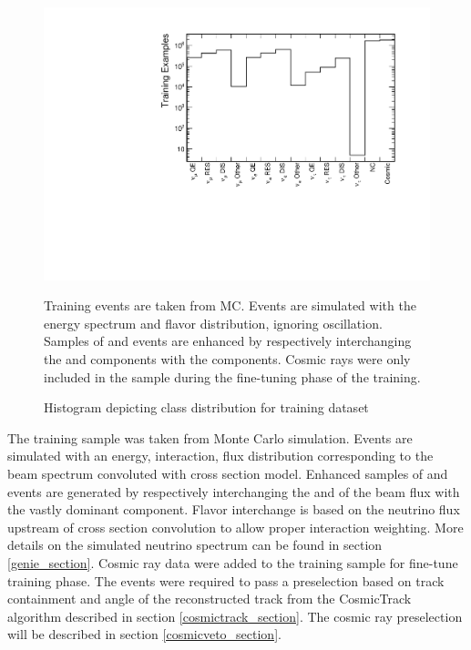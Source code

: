 \begin{figure}[t]
\begin{center}
\includegraphics[width=\textwidth]{figures/cnn/traindist.pdf}
\end{center}
\caption{Histogram depicting class distribution for training dataset}{
  Training events are taken from \nova MC.  Events are simulated with the
  \numi energy spectrum and flavor distribution, ignoring oscillation.
  Samples of \nue and \nutau events are enhanced by respectively interchanging the \nue and \nutau components with the \numu components.
  Cosmic rays were only included in the sample during the fine-tuning phase of
  the training.
}
\label{traindist}
\end{figure}

The training sample was taken from \nova Monte Carlo simulation.
Events are simulated with an energy, interaction, flux distribution
corresponding to the \numi beam spectrum convoluted with \genie
cross section model.  Enhanced samples of \nue and \nutau
events are generated by respectively interchanging the \nue and \nutau
of the \numi beam flux with the vastly dominant \numu component.
Flavor interchange is based on the neutrino flux
upstream of \genie cross section convolution to allow proper interaction
weighting.
More details on the simulated neutrino spectrum can be found in section
\ref{genie_section}.
Cosmic ray data were added to the training sample for fine-tune training phase.
The events were required to pass a preselection based on track
containment and angle of the reconstructed track from the CosmicTrack algorithm
described in section \ref{cosmictrack_section}.
The cosmic ray preselection will be described in section
\ref{cosmicveto_section}.



